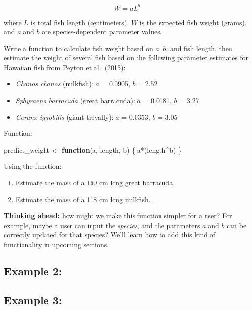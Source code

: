 \documentclass[
]{book}
\newenvironment{Shaded}{\begin{snugshade}}{\end{snugshade}}
\newcommand{\ControlFlowTok}[1]{\textcolor[rgb]{0.13,0.29,0.53}{\textbf{#1}}}
\newcommand{\NormalTok}[1]{#1}
\newcommand{\OtherTok}[1]{\textcolor[rgb]{0.56,0.35,0.01}{#1}}
\newcommand{\SpecialCharTok}[1]{\textcolor[rgb]{0.00,0.00,0.00}{#1}}
\providecommand{\tightlist}{%
  \setlength{\itemsep}{0pt}\setlength{\parskip}{0pt}}
\begin{document}
\[W=aL^b\]

where \(L\) is total fish length (centimeters), \(W\) is the expected fish weight (grams), and \(a\) and \(b\) are species-dependent parameter values.

Write a function to calculate fish weight based on \(a\), \(b\), and fish length, then estimate the weight of several fish based on the following parameter estimates for Hawaiian fish from Peyton et al.~(2015):

\begin{itemize}
\tightlist
\item
  \emph{Chanos chanos} (milkfish): \(a\) = 0.0905, \(b\) = 2.52
\item
  \emph{Sphyraena barracuda} (great barracuda): \(a\) = 0.0181, \(b\) = 3.27
\item
  \emph{Caranx ignobilis} (giant trevally): \(a\) = 0.0353, \(b\) = 3.05
\end{itemize}

Function:

\begin{Shaded}
\begin{Highlighting}[]
\NormalTok{predict\_weight }\OtherTok{\textless{}{-}} \ControlFlowTok{function}\NormalTok{(a, length, b) \{}
\NormalTok{  a}\SpecialCharTok{*}\NormalTok{(length}\SpecialCharTok{\^{}}\NormalTok{b)}
\NormalTok{\}}
\end{Highlighting}
\end{Shaded}

Using the function:

\begin{enumerate}
\def\labelenumi{\arabic{enumi}.}
\tightlist
\item
  Estimate the mass of a 160 cm long great barracuda.
\item
  Estimate the mass of a 118 cm long milkfish.
\end{enumerate}

\textbf{Thinking ahead:} how might we make this function simpler for a user? For example, maybe a user can input the \emph{species}, and the parameters \(a\) and \(b\) can be correctly updated for that species? We'll learn how to add this kind of functionality in upcoming sections.

\hypertarget{example-2}{%
\subsection{Example 2:}\label{example-2}}

\hypertarget{example-3}{%
\subsection{Example 3:}\label{example-3}}
\end{document}
